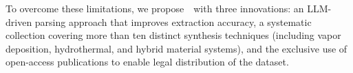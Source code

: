 To overcome these limitations, we propose~\oursdatashort~with three innovations: an LLM-driven parsing approach that improves extraction accuracy, a systematic collection covering more than ten distinct synthesis techniques (including vapor deposition, hydrothermal, and hybrid material systems), and the exclusive use of open-access publications to enable legal distribution of the dataset.


\label{subsec:quality_verification}







